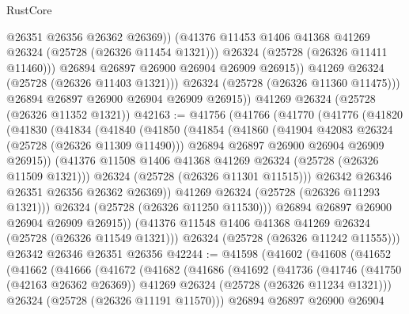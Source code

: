 \begin{lexlean}{RustCore}
\begin{coremodule}
                      @26351
                      @26356
                      @26362
                      @26369))
                  (@41376 @11453 @1406 @41368 @41269 @26324 (@25728 (@26326 @11454 @1321)))
                  @26324
                  (@25728 (@26326 @11411 @11460)))
                @26894
                @26897
                @26900
                @26904
                @26909
                @26915))
            @41269
            @26324
            (@25728 (@26326 @11403 @1321)))
          @26324
          (@25728 (@26326 @11360 @11475)))
        @26894
        @26897
        @26900
        @26904
        @26909
        @26915))
    @41269
    @26324
    (@25728 (@26326 @11352 @1321))
@42163 := @41756
    (@41766
      (@41770
        (@41776
          (@41820
            (@41830
              (@41834
                (@41840
                  (@41850
                    (@41854
                      (@41860
                        (@41904 @42083 @26324 (@25728 (@26326 @11309 @11490)))
                        @26894
                        @26897
                        @26900
                        @26904
                        @26909
                        @26915))
                    (@41376 @11508 @1406 @41368 @41269 @26324 (@25728 (@26326 @11509 @1321)))
                    @26324
                    (@25728 (@26326 @11301 @11515)))
                  @26342
                  @26346
                  @26351
                  @26356
                  @26362
                  @26369))
              @41269
              @26324
              (@25728 (@26326 @11293 @1321)))
            @26324
            (@25728 (@26326 @11250 @11530)))
          @26894
          @26897
          @26900
          @26904
          @26909
          @26915))
      (@41376 @11548 @1406 @41368 @41269 @26324 (@25728 (@26326 @11549 @1321)))
      @26324
      (@25728 (@26326 @11242 @11555)))
    @26342
    @26346
    @26351
    @26356
@42244 := @41598
    (@41602
      (@41608
        (@41652
          (@41662
            (@41666
              (@41672
                (@41682
                  (@41686
                    (@41692
                      (@41736
                        (@41746
                          (@41750 (@42163 @26362 @26369))
                          @41269
                          @26324
                          (@25728 (@26326 @11234 @1321)))
                        @26324
                        (@25728 (@26326 @11191 @11570)))
                      @26894
                      @26897
                      @26900
                      @26904

\end{coremodule}
\end{lexlean}
